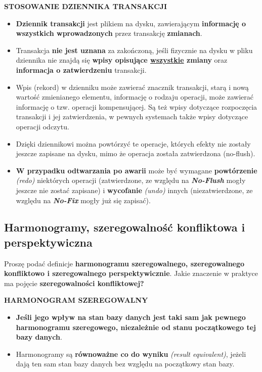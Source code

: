 \textbf{STOSOWANIE DZIENNIKA TRANSAKCJI}
\begin{itemize}
    \item \textbf{Dziennik transakcji} jest plikiem na dysku, zawierającym
    \textbf{informację o\\ wszystkich wprowadzonych} przez transakcję
    \textbf{zmianach}.
    \item Transakcja \textbf{nie jest uznana} za zakończoną, jeśli fizycznie
    na dysku w pliku dziennika nie znajdą się \textbf{wpisy opisujące
    \underline{wszystkie} zmiany} oraz \textbf{informacja o
    zatwierdzeniu} transakcji.
    \item Wpis (rekord) w dzienniku może zawierać znacznik transakcji, starą
    i nową wartość zmienianego elementu, informację o rodzaju
    operacji, może zawierać informację o tzw. operacji kompensującej.
    Są też wpisy dotyczące rozpoczęcia transakcji i jej
    zatwierdzenia, w pewnych systemach także wpisy dotyczące operacji
    odczytu.
    \item Dzięki dziennikowi można powtórzyć te operacje, których efekty nie
    zostały jeszcze zapisane na dysku, mimo że operacja została
    zatwierdzona (no-flush).
    \item \textbf{W przypadku odtwarzania po awarii} może być wymagane
    \textbf{powtórzenie} \textit{(redo)} niektórych operacji
    (zatwierdzone, ze względu na \textit{\textbf{No-Flush}} mogły\\
    jeszcze nie zostać zapisane) i \textbf{wycofanie} \textit{(undo)}
    innych (niezatwierdzone, ze względu na \textit{\textbf{No-Fix}}
    mogły już się zapisać).
\end{itemize}


\pagebreak

\subsection{Harmonogramy, szeregowalność konfliktowa i perspektywiczna}
\label{sub:harmonogramy_szeregowalnosc_konfliktowa_i_perspektywiczna}

\horrule{0.5pt}
Proszę podać definicje \textbf{harmonogramu szeregowalnego, szeregowalnego
konfliktowo i szeregowalnego perspektywicznie}. Jakie znaczenie w praktyce
ma pojęcie \textbf{szeregowalności konfliktowej?}\\
\horrule{0.5pt}

\vskip 0.5cm

\textbf{HARMONOGRAM SZEREGOWALNY}
\begin{itemize}
    \item \textbf{Jeśli jego wpływ na stan bazy danych jest taki sam jak
    pewnego harmonogramu szeregowego, niezależnie od stanu
    początkowego tej bazy danych}.
    \item Harmonogramy są \textbf{równoważne co do wyniku}
    \textit{(result equivalent)}, jeżeli dają ten sam stan bazy danych
    bez względu na początkowy stan bazy.
\end{itemize}

